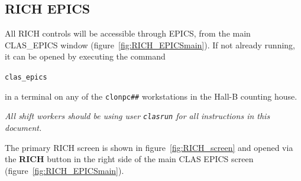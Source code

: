 \documentclass[12pt]{article}
\begin{document}
{
 \twocolumn
\subsection{RICH EPICS}
}
All RICH controls will be  accessible through EPICS, from the main CLAS\_EPICS window (figure~\ref{fig:RICH_EPICSmain}).  If not already running, it can be opened by executing
the command 
\begin{center}
\texttt{clas\_epics}
\end{center}
 in a terminal on any of the \texttt{clonpc\#\#} workstations in the Hall-B counting house.

{\em   All shift workers should be using user \texttt{clasrun} for all instructions in this document.}

The primary RICH screen is shown in figure~\ref{fig:RICH_screen} and opened via the {\bf RICH} button in the right side of the main CLAS EPICS 
screen (figure~\ref{fig:RICH_EPICSmain}).

\end{document}
